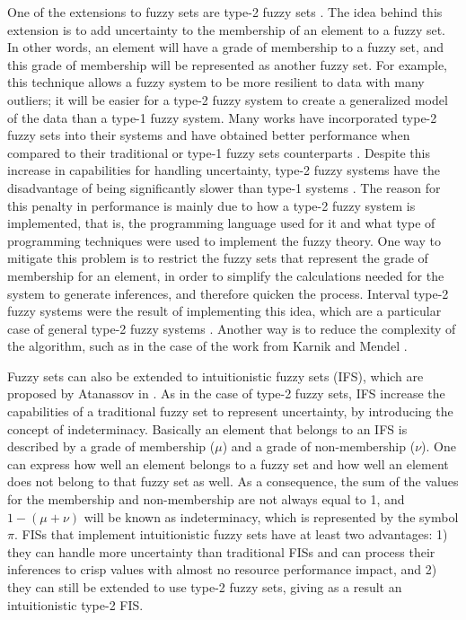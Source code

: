 One of the extensions to fuzzy sets are type-2 fuzzy sets \cite{Mendel2002}. The
idea behind this extension is to add uncertainty to the membership of an element
to a fuzzy set. In other words, an element will have a grade of membership to a
fuzzy set, and this grade of membership will be represented as another fuzzy
set. For example, this technique allows a fuzzy system to be more resilient to
data with many outliers; it will be easier for a type-2 fuzzy system to create a
generalized model of the data than a type-1 fuzzy system. Many works have
incorporated type-2 fuzzy sets into their systems and have obtained better
performance when compared to their traditional or type-1 fuzzy sets counterparts
\cite{Liang2000}. Despite this increase in capabilities for handling
uncertainty, type-2 fuzzy systems have the disadvantage of being significantly
slower than type-1 systems \cite{Sepulveda2012}. The reason for this penalty in
performance is mainly due to how a type-2 fuzzy system is implemented, that is,
the programming language used for it and what type of programming techniques
were used to implement the fuzzy theory. One way to mitigate this problem is to
restrict the fuzzy sets that represent the grade of membership for an element,
in order to simplify the calculations needed for the system to generate
inferences, and therefore quicken the process. Interval type-2 fuzzy systems
were the result of implementing this idea, which are a particular case of
general type-2 fuzzy systems \cite{Mendel2006}. Another way is to reduce the
complexity of the algorithm, such as in the case of the work from Karnik and
Mendel \cite{Karnik2001}.

Fuzzy sets can also be extended to intuitionistic fuzzy sets (IFS), which are
proposed by Atanassov in \cite{Atanassov1986}. As in the case of type-2 fuzzy
sets, IFS increase the capabilities of a traditional fuzzy set to represent
uncertainty, by introducing the concept of indeterminacy. Basically an element
that belongs to an IFS is described by a grade of membership (\(\mu\)) and a
grade of non-membership (\(\nu\)). One can express how well an element belongs
to a fuzzy set and how well an element does not belong to that fuzzy set as
well. As a consequence, the sum of the values for the membership and
non-membership are not always equal to 1, and \(1-(\mu + \nu)\) will be known as
indeterminacy, which is represented by the symbol \(\pi\). FISs that implement
intuitionistic fuzzy sets have at least two advantages: 1) they can handle more
uncertainty than traditional FISs and can process their inferences to crisp
values with almost no resource performance impact, and 2) they can still be
extended to use type-2 fuzzy sets, giving as a result an intuitionistic type-2
FIS.

